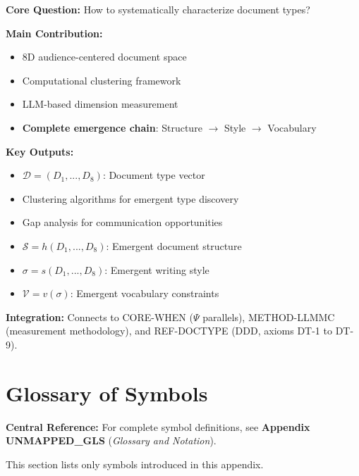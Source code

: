 \begin{tcolorbox}[colback=green!10!white, colframe=green!75!black,
    title=\textbf{Appendix UNMAPPED_DTC: Summary}]

\textbf{Core Question:} How to systematically characterize document types?

\textbf{Main Contribution:}
\begin{itemize}[nosep]
    \item 8D audience-centered document space
    \item Computational clustering framework
    \item LLM-based dimension measurement
    \item \textbf{Complete emergence chain}: Structure $\to$ Style $\to$ Vocabulary
\end{itemize}

\textbf{Key Outputs:}
\begin{itemize}[nosep]
    \item $\mathcal{D} = (D_1, ..., D_8)$: Document type vector
    \item Clustering algorithms for emergent type discovery
    \item Gap analysis for communication opportunities
    \item $\mathcal{S} = h(D_1, ..., D_8)$: Emergent document structure
    \item $\sigma = s(D_1, ..., D_8)$: Emergent writing style
    \item $\mathcal{V} = v(\sigma)$: Emergent vocabulary constraints
\end{itemize}

\textbf{Integration:} Connects to CORE-WHEN ($\Psi$ parallels),
METHOD-LLMMC (measurement methodology), and REF-DOCTYPE (DDD, axioms DT-1 to DT-9).

\end{tcolorbox}


\section{Glossary of Symbols}
\label{sec:doctype-glossary}

\begin{tcolorbox}[colback=blue!5!white, colframe=blue!75!black]
\textbf{Central Reference:} For complete symbol definitions, see
\textbf{Appendix UNMAPPED_GLS} (\textit{Glossary and Notation}).

This section lists only symbols introduced in this appendix.
\end{tcolorbox}

